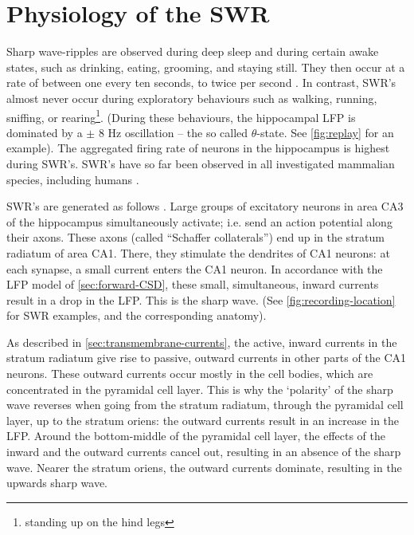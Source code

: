 \section{Physiology of the SWR}
\label{sec:physiology}

Sharp wave-ripples are observed during deep sleep\footnotemark{} and during certain awake states, such as drinking, eating, grooming, and staying still. They then occur at a rate of between one every ten seconds, to twice per second \cite{Girardeau2011}. In contrast, SWR's almost never occur during exploratory behaviours such as walking, running, sniffing, or rearing\footnote{standing up on the hind legs}. (During these behaviours, the hippocampal LFP is dominated by a $\pm$ 8 Hz oscillation -- the so called $\theta$-state. See \cref{fig:replay} for an example). The aggregated firing rate of neurons in the hippocampus is highest during SWR's. SWR's have so far been observed in all investigated mammalian species, including humans \cite{Buzsaki2015}.


SWR's are generated as follows \cite{Girardeau2011,Buzsaki2015}. Large groups of excitatory neurons in area CA3 of the hippocampus simultaneously activate; i.e. send an action potential along their axons. These axons (called ``Schaffer collaterals'') end up in the stratum radiatum of area CA1. There, they stimulate the dendrites of CA1 neurons: at each synapse, a small current enters the CA1 neuron. In accordance with the LFP model of \cref{sec:forward-CSD}, these small, simultaneous, inward currents result in a drop in the LFP. This is the sharp wave. (See \cref{fig:recording-location} for SWR examples, and the corresponding anatomy).

As described in \cref{sec:transmembrane-currents}, the active, inward currents in the stratum radiatum give rise to passive, outward currents in other parts of the CA1 neurons. These outward currents occur mostly in the cell bodies, which are concentrated in the pyramidal cell layer. This is why the `polarity' of the sharp wave reverses when going from the stratum radiatum, through the pyramidal cell layer, up to the stratum oriens: the outward currents result in an increase in the LFP. Around the bottom-middle of the pyramidal cell layer, the effects of the inward and the outward currents cancel out, resulting in an absence of the sharp wave. Nearer the stratum oriens, the outward currents dominate, resulting in the upwards sharp wave.

